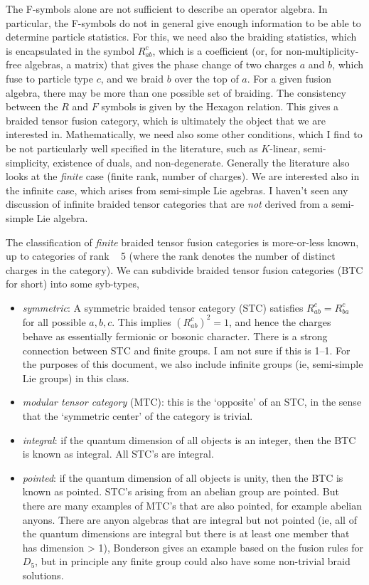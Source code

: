 \documentclass[12pt]{article}
\begin{document}
The F-symbols alone are not sufficient to describe an operator algebra.  In particular, the F-symbols
do not in general give enough information to be able to determine particle statistics. For
this, we need also the braiding statistics, which is encapsulated in the symbol $R^{c}_{ab}$, which
is a coefficient (or, for non-multiplicity-free algebras, a matrix) that gives the phase change
of two charges $a$ and $b$, which fuse to particle type $c$, and we braid $b$ over the top of $a$.
For a given fusion algebra, there may be more than one possible set of braiding. The consistency
between the $R$ and $F$ symbols is given by the Hexagon relation. This gives
a braided tensor fusion category, which is ultimately the object that we are interested in.
Mathematically, we need also some other conditions, which I find to be not particularly well specified
in the literature, such as $K$-linear, semi-simplicity, existence of duals, and non-degenerate. 
Generally the literature
also looks at the \emph{finite} case (finite rank, number of charges). We are interested also in the infinite case,
which arises from semi-simple Lie agebras. I haven't seen any discussion of infinite braided tensor
categories that are \emph{not} derived from a semi-simple Lie algebra.

The classification of \emph{finite} braided tensor fusion categories is more-or-less known, up to
categories of rank ~ 5 (where the rank denotes the number of distinct charges in the category).
We can subdivide braided tensor fusion categories (BTC for short) into some syb-types,
\begin{itemize}
\item \emph{symmetric}: A symmetric braided tensor category (STC) satisfies $R^{c}_{ab} = R^{c}_{ba}$ for
all possible $a,b,c$. This implies $(R^{c}_{ab})^2 = 1$, and hence the charges behave as essentially
fermionic or bosonic character. There is a strong connection between STC and finite groups. I am not sure
if this is 1--1. For the purposes of this document, we also include infinite groups (ie, semi-simple
Lie groups) in this class. 
\item \emph{modular tensor category} (MTC): this is the `opposite' of an STC, in the sense that the
`symmetric center' of the category is trivial. 
\item \emph{integral}: if the quantum dimension of all objects is an integer, then the BTC is known as integral. 
All STC's are integral. 
\item \emph{pointed}: if the quantum dimension of all objects is unity, then the BTC is known as pointed.
STC's arising from an abelian group are pointed. But there are many examples of MTC's that are also pointed,
for example abelian anyons. There are anyon algebras that are integral but not pointed (ie, all of the quantum
dimensions are integral but there is at least one member that has dimension > 1), Bonderson gives an example
based on the fusion rules for $D_5$, but in principle any finite group could also have some non-trivial braid solutions.
\end{itemize}
\end{document}
